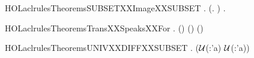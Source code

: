 \newcommand{\HOLaclrulesTheoremsspeaksXXforXXSUBSET}{\UseVerbatim{HOLaclrulesTheoremsspeaksXXforXXSUBSET}}
\begin{SaveVerbatim}{HOLaclrulesTheoremsSUBSETXXImageXXSUBSET}
\HOLTokenTurnstile{} \HOLSymConst{\HOLTokenForall{}}  .
     (\HOLSymConst{\HOLTokenForall{}}.   \HOLConst{\HOLTokenSubset{}}  ) \HOLSymConst{\HOLTokenImp{}}
     \HOLSymConst{\HOLTokenForall{}}. \HOLTokenLeftbrace{} \HOLTokenBar{}   \HOLConst{\HOLTokenSubset{}} \HOLTokenRightbrace{} \HOLConst{\HOLTokenSubset{}} \HOLTokenLeftbrace{} \HOLTokenBar{}   \HOLConst{\HOLTokenSubset{}} \HOLTokenRightbrace{}
\end{SaveVerbatim}
\newcommand{\HOLaclrulesTheoremsSUBSETXXImageXXSUBSET}{\UseVerbatim{HOLaclrulesTheoremsSUBSETXXImageXXSUBSET}}
\begin{SaveVerbatim}{HOLaclrulesTheoremsTransXXSpeaksXXFor}
\HOLTokenTurnstile{} \HOLSymConst{\HOLTokenForall{}}     .
     (\HOLSymConst{,}\HOLSymConst{,})     \HOLSymConst{\HOLTokenImp{}}
     (\HOLSymConst{,}\HOLSymConst{,})     \HOLSymConst{\HOLTokenImp{}}
     (\HOLSymConst{,}\HOLSymConst{,})    
\end{SaveVerbatim}
\newcommand{\HOLaclrulesTheoremsTransXXSpeaksXXFor}{\UseVerbatim{HOLaclrulesTheoremsTransXXSpeaksXXFor}}
\begin{SaveVerbatim}{HOLaclrulesTheoremsUNIVXXDIFFXXSUBSET}
\HOLTokenTurnstile{} \HOLSymConst{\HOLTokenForall{}} .  \HOLConst{\HOLTokenSubset{}}  \HOLSymConst{\HOLTokenImp{}} (\ensuremath{\cal{U}}(:'a)   \HOLConst{\HOLTokenUnion{}}  \HOLSymConst{=} \ensuremath{\cal{U}}(:'a))
\end{SaveVerbatim}
